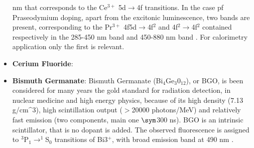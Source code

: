 \begin{itemize}
nm that corresponds to the Ce$^{3+}$ 5d$\rightarrow$4f transitions.
In the case pf Praseodymium doping, apart from the excitonic luminescence, two bands are present, corresponding to the Pr$^{3+}$ 4f5d$\rightarrow$4f$^{2}$ and 4f$^{2}\rightarrow$4f$^{2}$ contained respectively in the 285-450 nm band and 450-880 nm band \cite{Drozdowski2008}. For calorimetry application only the first is relevant. 
\item \textbf{Cerium Fluoride}:
\item \textbf{Bismuth Germanate}: Bismuth Germanate (Bi$_{4}$Ge$_{3}$0$_{12}$), or BGO, is been considered for many years the gold standard for radiation detection, in nuclear medicine and high energy physics, because of its high density (7.13 g/cm$\^{3}$), high scintillation output ($>$20000 photons/MeV) and relatively fast emission (two components, main one $\sym$300 ns).
BGO is an intrinsic scintillator, that is no dopant is added. The observed fluorescence is assigned to $^{3}$P$_{1}\rightarrow ^{1}$S$_{0}$ transitions of Bi3$^{+}$, with broad emission band at 490 nm \cite{Weber1996}.
\end{itemize}